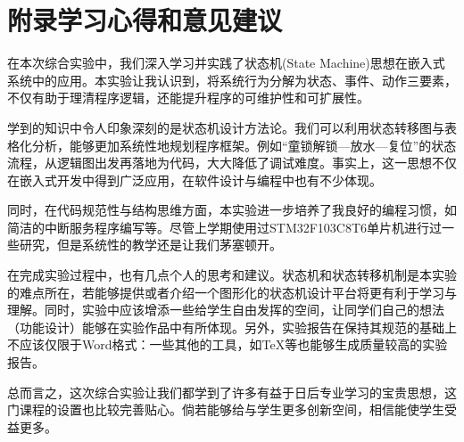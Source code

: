 \documentclass{article}
\begin{document}
\section*{附录\quad 学习心得和意见建议}

在本次综合实验中，我们深入学习并实践了状态机(State Machine)思想在嵌入式系统中的应用。本实验让我认识到，将系统行为分解为状态、事件、动作三要素，不仅有助于理清程序逻辑，还能提升程序的可维护性和可扩展性。

学到的知识中令人印象深刻的是状态机设计方法论。我们可以利用状态转移图与表格化分析，能够更加系统性地规划程序框架。例如“童锁解锁—放水—复位”的状态流程，从逻辑图出发再落地为代码，大大降低了调试难度。事实上，这一思想不仅在嵌入式开发中得到广泛应用，在软件设计与编程中也有不少体现。

同时，在代码规范性与结构思维方面，本实验进一步培养了我良好的编程习惯，如简洁的中断服务程序编写等。尽管上学期使用过STM32F103C8T6单片机进行过一些研究，但是系统性的教学还是让我们茅塞顿开。

在完成实验过程中，也有几点个人的思考和建议。状态机和状态转移机制是本实验的难点所在，若能够提供或者介绍一个图形化的状态机设计平台将更有利于学习与理解。同时，实验中应该增添一些给学生自由发挥的空间，让同学们自己的想法（功能设计）能够在实验作品中有所体现。另外，实验报告在保持其规范的基础上不应该仅限于Word格式：一些其他的工具，如\TeX 等也能够生成质量较高的实验报告。

总而言之，这次综合实验让我们都学到了许多有益于日后专业学习的宝贵思想，这门课程的设置也比较完善贴心。倘若能够给与学生更多创新空间，相信能使学生受益更多。
\end{document}
